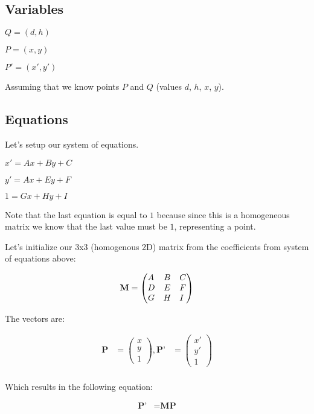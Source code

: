 \documentclass[12pt]{article}
\begin{document}
\subsection{Variables}

$Q = (d, h)$

$P = (x,y)$

$P' = (x', y')$

Assuming that we know points $P$ and $Q$ (values $d$, $h$, $x$, $y$).

\subsection{Equations}

Let's setup our system of equations.

$x' = Ax + By + C$

$y' = Ax + Ey + F$

$1  = Gx + Hy + I$

Note that the last equation is equal to $1$ because 
since this is a homogeneous matrix we know that the 
last value must be $1$, representing a point.

Let's initialize our 3x3 (homogenous 2D) matrix from the 
coefficients from system of equations above:

\begin{align}
\textbf{M} &=
\begin{pmatrix}
A \hfill & B & C \\
D & E & F \hfill \\
G & H & I \hfill 
\end{pmatrix} \nonumber \\
\end{align}

The vectors are:

\begin{align}
\textbf{P} &=
\begin{pmatrix}
x \\
y \\
1  
\end{pmatrix} \nonumber 
, 
\textbf{P'} &=
\begin{pmatrix}
x' \\
y' \\
1  
\end{pmatrix} \nonumber \\
\end{align}

Which results in the following equation:

\begin{align}
\textbf{P'} &= \textbf{M} \textbf{P}
\end{align}
\end{document}
